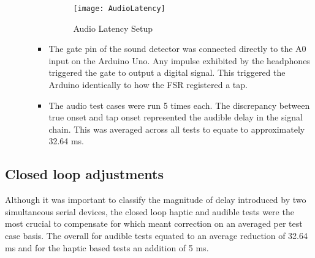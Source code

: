 \begin{itemize}
\begin{itemize}
\begin{itemize}
            \begin{figure}[H]
                \centering
                \texttt{[image: AudioLatency]}
                \caption{Audio Latency Setup}
            \end{figure}
            \item The gate pin of the sound detector was connected directly to the A0 input on the Arduino Uno. Any impulse exhibited by the headphones triggered the gate to output a digital signal. This triggered the Arduino identically to how the FSR registered a tap. 
            \item The audio test cases were run 5 times each. The discrepancy between true onset and tap onset represented the audible delay in the signal chain. This was averaged across all tests to equate to approximately 32.64 ms.
        \end{itemize}
    \end{itemize}
\end{itemize}
\subsection{Closed loop adjustments}
Although it was important to classify the magnitude of delay introduced by two simultaneous serial devices, the closed loop haptic and audible tests were the most crucial to compensate for which meant correction on an averaged per test case basis. The overall for audible tests equated to an average reduction of 32.64 ms and for the haptic based tests an addition of 5 ms.